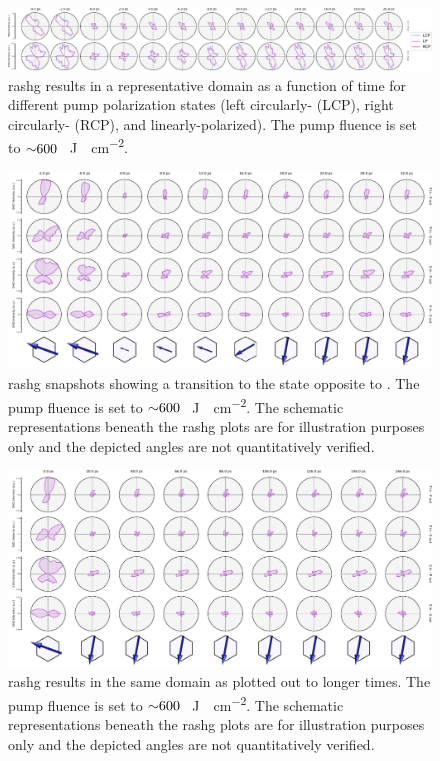 \begin{figure}
\centering
\includegraphics[width=\textwidth]{./gfx/ch6/polarization.pdf}
\caption{\label{polarization}\gls{rashg} results in a representative domain as a function of time for different pump polarization states (left circularly- (LCP), right circularly- (RCP), and linearly-polarized).
The pump fluence is set to ${\sim} 600$ \si{\mu J \cdot cm^{-2}}.
}
\end{figure}

\begin{figure}
\centering
\includegraphics[width=\textwidth]{./gfx/ch6/C2B_short.pdf}
\caption{\label{CtoBshort}\gls{rashg} snapshots showing a transition to the state opposite to .
The pump fluence is set to ${\sim} 600$ \si{\mu J \cdot cm^{-2}}.
\lastrow
The schematic representations beneath the \gls{rashg} plots are for illustration purposes only and the depicted angles are not quantitatively verified.
}
\end{figure}

\begin{figure}
\centering
\includegraphics[width=\textwidth]{./gfx/ch6/C2B_long.pdf}
\caption{\label{CtoBlong}\gls{rashg} results in the same domain as  plotted out to longer times.
The pump fluence is set to ${\sim} 600$ \si{\mu J \cdot cm^{-2}}.
\lastrow
The schematic representations beneath the \gls{rashg} plots are for illustration purposes only and the depicted angles are not quantitatively verified.
}
\end{figure}

